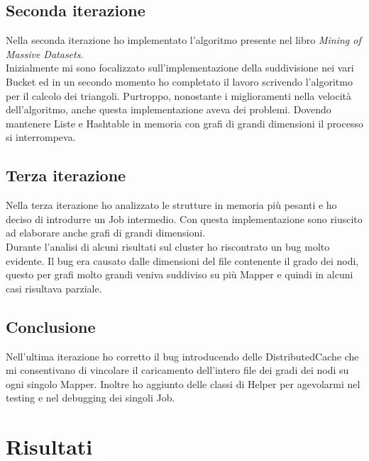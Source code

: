 \documentclass[paper=a4, fontsize=11pt]{scrartcl}	%
\numberwithin{equation}{section}															%
\numberwithin{figure}{section}																%
\numberwithin{table}{section}																%
\begin{document}
\subsection{Seconda iterazione} 
Nella seconda iterazione ho implementato l'algoritmo presente nel libro \textit{Mining of Massive Datasets}.\\
Inizialmente mi sono focalizzato sull'implementazione della suddivisione nei vari Bucket ed in un secondo momento ho completato il lavoro scrivendo l'algoritmo per il calcolo dei triangoli. Purtroppo, nonostante i miglioramenti nella velocità dell'algoritmo, anche questa implementazione aveva dei problemi. Dovendo mantenere Liste e Hashtable in memoria con grafi di grandi dimensioni il processo si interrompeva.
\subsection{Terza iterazione} 
Nella terza iterazione ho analizzato le strutture in memoria più pesanti e ho deciso di introdurre un Job intermedio. Con questa implementazione sono riuscito ad elaborare anche grafi di grandi dimensioni.\\ 
Durante l'analisi di alcuni risultati sul cluster ho riscontrato un bug molto evidente. Il bug era causato dalle dimensioni del file contenente il grado dei nodi, questo per grafi molto grandi veniva suddiviso su più Mapper e quindi in alcuni casi risultava parziale.
\subsection{Conclusione} 
Nell'ultima iterazione ho corretto il bug introducendo delle DistributedCache che mi consentivano di vincolare il caricamento dell'intero file dei gradi dei nodi su ogni singolo Mapper. Inoltre ho aggiunto delle classi di Helper per agevolarmi nel testing e nel debugging dei singoli Job.
\section{Risultati}
\end{document}
